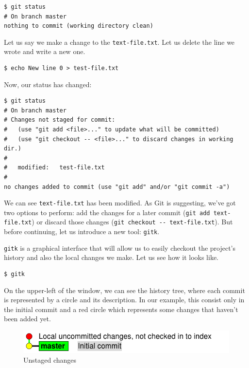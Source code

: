 \documentclass[a4paper,10pt]{article}
\newenvironment{terminal}
  {
    \vspace{+10pt}
    \begin{center}
    \begin{minipage}{0.95\textwidth}
    \begin{framed}
  }
  {
    \end{framed}
    \end{minipage}
    \end{center}
    \vspace{+10pt}
  }
\begin{document}
\begin{terminal}
\begin{verbatim}
$ git status
# On branch master
nothing to commit (working directory clean)
\end{verbatim}
\end{terminal}

Let us say we make a change to the \texttt{text-file.txt}. Let us delete the
line we wrote and write a new one.

\begin{terminal}
\begin{verbatim}
$ echo New line 0 > test-file.txt
\end{verbatim}
\end{terminal}

Now, our status has changed:

\begin{terminal}
\begin{verbatim}
$ git status
# On branch master
# Changes not staged for commit:
#   (use "git add <file>..." to update what will be committed)
#   (use "git checkout -- <file>..." to discard changes in working dir.)
#
#	modified:   test-file.txt
#
no changes added to commit (use "git add" and/or "git commit -a")
\end{verbatim}
\end{terminal}

We can see \texttt{text-file.txt} has been modified. As Git is
suggesting, we've got two options to perform: add the changes for a
later commit (\texttt{git add text-file.txt}) or discard those changes
(\texttt{git checkout -{}- text-file.txt}). But before continuing, let us
introduce a new tool: \texttt{gitk}.

\texttt{gitk} is a graphical interface that will allow us to easily
checkout the project's history and also the local changes we make. Let us
see how it looks like.

\begin{terminal}
\begin{verbatim}
$ gitk
\end{verbatim}
\end{terminal}

On the upper-left of the window, we can see the history tree, where
each commit is represented by a circle and its description. In our
example, this consist only in the initial commit and a red circle which
represents some changes that haven't been added yet.

\begin{figure}[h]
  \begin{center}
    \includegraphics[scale=0.5]{git_example-00}
  \end{center}
  \caption{Unstaged changes}
\end{figure}
\end{document}
